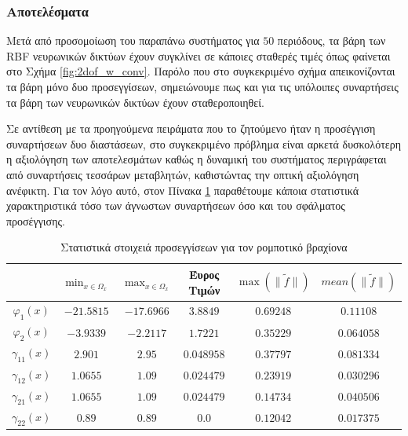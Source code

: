\subsubsection{Αποτελέσματα}
Μετά από προσομοίωση του παραπάνω συστήματος για $50$ περιόδους, τα βάρη των RBF νευρωνικών δικτύων έχουν συγκλίνει σε κάποιες σταθερές τιμές όπως φαίνεται στο Σχήμα \ref{fig:2dof_w_conv}. Παρόλο που στο συγκεκριμένο σχήμα απεικονίζονται τα βάρη μόνο δυο προσεγγίσεων, σημειώνουμε πως και για τις υπόλοιπες συναρτήσεις τα βάρη των νευρωνικών δικτύων έχουν σταθεροποιηθεί.

Σε αντίθεση με τα προηγούμενα πειράματα που το ζητούμενο ήταν η προσέγγιση συναρτήσεων δυο διαστάσεων, στο συγκεκριμένο πρόβλημα είναι αρκετά δυσκολότερη η αξιολόγηση των αποτελεσμάτων καθώς η δυναμική του συστήματος περιγράφεται από συναρτήσεις τεσσάρων μεταβλητών, καθιστώντας την οπτική αξιολόγηση ανέφικτη. Για τον λόγο αυτό, στον Πίνακα \ref{tab:statistics_2dof} παραθέτουμε κάποια στατιστικά χαρακτηριστικά  τόσο των άγνωστων συναρτήσεων όσο και του σφάλματος προσέγγισης.

\begin{table}
	\centering
	\begin{tabular}{  c | c | c | c | c | c }
		& $\min_{x \in \Omega_x}$ & $\max_{x \in \Omega_x}$ & Έυρος Τιμών & $\max(\| \tilde{f} \| )$ & $mean(\| \tilde{f} \|)$  \\ \hline \hline
		$\varphi_1(x)$ & $-21.5815$ & $-17.6966$ & $3.8849$ & $ 0.69248$ & $0.11108$ \\
		$\varphi_2(x)$ & $-3.9339$ & $-2.2117$ & $1.7221$ & $ 0.35229$ & $0.064058$ \\
		$\gamma_{11}(x)$ & $2.901$ & $2.95$ & $0.048958$ & $ 0.37797$ & $0.081334$ \\
		$\gamma_{12}(x)$ & $1.0655$ & $1.09$ & $0.024479$ & $ 0.23919$ & $0.030296$ \\
		$\gamma_{21}(x)$ & $1.0655$ & $1.09$ & $0.024479$ & $ 0.14734$ & $0.040506$ \\
		$\gamma_{22}(x)$ & $0.89$ & $0.89$ & $0.0$ & $ 0.12042$ & $0.017375$ \\
	\end{tabular}
	\caption{Στατιστικά στοιχειά προσεγγίσεων για τον ρομποτικό βραχίονα}
	\label{tab:statistics_2dof}
\end{table}

